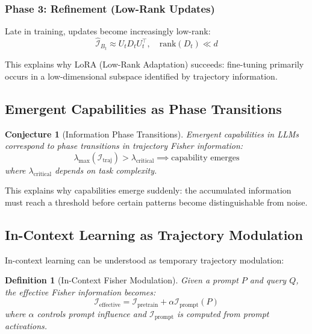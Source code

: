 \documentclass[11pt]{article}
\newtheorem{definition}[theorem]{Definition}
\newtheorem{conjecture}[theorem]{Conjecture}
\begin{document}
\subsubsection{Phase 3: Refinement (Low-Rank Updates)}

Late in training, updates become increasingly low-rank:
\begin{equation}
\hat{\mathcal{I}}_{B_t} \approx U_t D_t U_t^\top, \quad \text{rank}(D_t) \ll d
\end{equation}

This explains why LoRA (Low-Rank Adaptation) succeeds: fine-tuning primarily occurs in a low-dimensional subspace identified by trajectory information.

\subsection{Emergent Capabilities as Phase Transitions}

\begin{conjecture}[Information Phase Transitions]
Emergent capabilities in LLMs correspond to phase transitions in trajectory Fisher information:
\begin{equation}
\lambda_{\max}(\mathcal{I}_{\text{traj}}) > \lambda_{\text{critical}} \implies \text{capability emerges}
\end{equation}
where $\lambda_{\text{critical}}$ depends on task complexity.
\end{conjecture}

This explains why capabilities emerge suddenly: the accumulated information must reach a threshold before certain patterns become distinguishable from noise.

\subsection{In-Context Learning as Trajectory Modulation}

In-context learning can be understood as temporary trajectory modulation:

\begin{definition}[In-Context Fisher Modulation]
Given a prompt $P$ and query $Q$, the effective Fisher information becomes:
\begin{equation}
\mathcal{I}_{\text{effective}} = \mathcal{I}_{\text{pretrain}} + \alpha \mathcal{I}_{\text{prompt}}(P)
\end{equation}
where $\alpha$ controls prompt influence and $\mathcal{I}_{\text{prompt}}$ is computed from prompt activations.
\end{definition}
\end{document}
